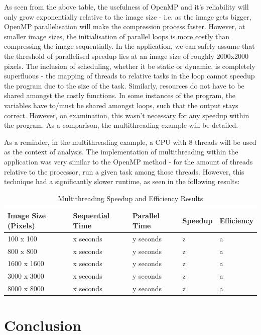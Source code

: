 \documentclass[12pt, a4paper]{article}
\begin{document}
As seen from the above table, the usefulness of OpenMP and it's reliability will only grow exponentially relative to the image size - i.e. as the image gets bigger, OpenMP parallelisation will make the compression process faster. However, at smaller image sizes, the initialisation of parallel loops is more costly than compressing the image sequentially. In the application, we can safely assume that the threshold of parallelised speedup lies at an image size of roughly 2000x2000 pixels. The inclusion of scheduling, whether it be static or dynamic, is completely superfluous - the mapping of threads to relative tasks in the loop cannot speedup the program due to the size of the task. Similarly, resources do not have to be shared amongst the costly functions. In some instances of the program, the variables have to/must be shared amongst loops, such that the output stays correct. However, on examination, this wasn't necessary for any speedup within the program. As a comparison, the multithreading example will be detailed.

As a reminder, in the multithreading example, a CPU with 8 threads will be used as the context of analysis. The implementation of multithreading within the application was very similar to the OpenMP method - for the amount of threads relative to the processor, run a given task among those threads. However, this technique had a significantly slower runtime, as seen in the following results:

\begin{table}[H]
    \centering
    \begin{tabular}{| l | l | l | l | l |}
    \hline
    Image Size (Pixels) & Sequential Time & Parallel Time & Speedup & Efficiency \\ \hline
    100 x 100 & x seconds & y seconds & z & a \\ \hline
    800 x 800 & x seconds & y seconds & z & a \\ \hline
    1600 x 1600 & x seconds & y seconds & z & a \\ \hline
    3000 x 3000 & x seconds & y seconds & z & a \\ \hline
    8000 x 8000 & x seconds & y seconds & z & a \\ \hline
    \end{tabular}
    \caption{Multithreading Speedup and Efficiency Results}
\end{table}

\section{Conclusion}

\newpage


{}
\nocite{*}
\end{document}
